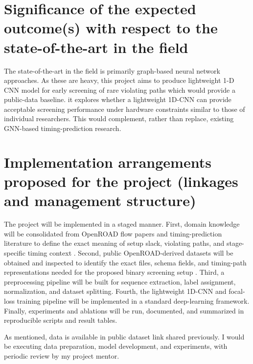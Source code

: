 \documentclass[12pt,a4paper]{article}
\begin{document}
\section{Significance of the expected outcome(s) with respect to the state-of-the-art in 
the field}


The state-of-the-art in the field is primarily graph-based neural network approaches. As these are heavy, this project aims to produce lightweight 1-D CNN model for early screening of rare violating paths which would provide a public-data baseline. it explores whether a lightweight 1D-CNN can provide acceptable screening performance under hardware constraints similar to those of individual researchers. This would complement, rather than replace, existing GNN-based timing-prediction research.

\section{Implementation arrangements proposed for the project (linkages and management structure) }


The project will be implemented in a staged manner. First, domain knowledge will be consolidated from OpenROAD flow papers and timing-prediction literature to define the exact meaning of setup slack, violating paths, and stage-specific timing context \cite{Ajayi2019INVITED:,Kahng2021The,Li2025Pre-Routing}. Second, public OpenROAD-derived datasets will be obtained and inspected to identify the exact files, schema fields, and timing-path representations needed for the proposed binary screening setup \cite{Shrestha2026EDA-Schema-V2:,Shrestha2024EDA-schema:}. Third, a preprocessing pipeline will be built for sequence extraction, label assignment, normalization, and dataset splitting. Fourth, the lightweight 1D-CNN and focal-loss training pipeline will be implemented in a standard deep-learning framework. Finally, experiments and ablations will be run, documented, and summarized in reproducible scripts and result tables.

As mentioned, data is available in public dataset link shared previously. I would be executing data preparation, model development, and experiments, with periodic review by my project mentor.
\end{document}
